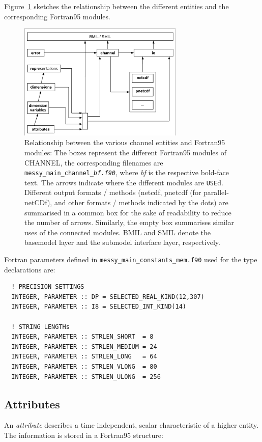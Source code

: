 \documentclass[twoside]{article}
\begin{document}
Figure~\ref{fig:channelmodules} sketches the relationship between
the different entities and the corresponding Fortran95 modules.
%
\begin{figure}
  \centerline{\includegraphics[width=0.7\textwidth]{channel_modules}}
  \caption[Relationship between channel entities and modules]
          {Relationship between the various channel entities and Fortran95
          modules: The boxes represent the different Fortran95 modules of
          CHANNEL, the corresponding filenames are
          {\tt messy\_main\_channel\_{\it bf.f90}}, where {\it bf} is the
          respective bold-face text. The arrows indicate where the different
          modules are {\tt USE}d. Different output formats / methods
          (netcdf, pnetcdf (for parallel-netCDf), and other formats / methods
          indicated by the dots) are summarised in a common box for the sake of
          readability to reduce the number of arrows. Similarly, the empty
          box summarises similar uses of the connected modules.
          BMIL and SMIL denote the basemodel layer and the submodel interface
          layer, respectively.}
  \label{fig:channelmodules}
\end{figure}
%

Fortran parameters defined in {\tt messy\_main\_constants\_mem.f90} used
for the type declarations are:
\begin{verbatim}
  ! PRECISION SETTINGS
  INTEGER, PARAMETER :: DP = SELECTED_REAL_KIND(12,307)
  INTEGER, PARAMETER :: I8 = SELECTED_INT_KIND(14)

  ! STRING LENGTHs
  INTEGER, PARAMETER :: STRLEN_SHORT  = 8
  INTEGER, PARAMETER :: STRLEN_MEDIUM = 24
  INTEGER, PARAMETER :: STRLEN_LONG   = 64
  INTEGER, PARAMETER :: STRLEN_VLONG  = 80
  INTEGER, PARAMETER :: STRLEN_ULONG  = 256
\end{verbatim}

%
\subsection{Attributes}
\label{sec:att}
An {\it attribute} describes a time independent, scalar
characteristic of a higher entity.
The information is stored in a Fortran95 structure:
\end{document}
